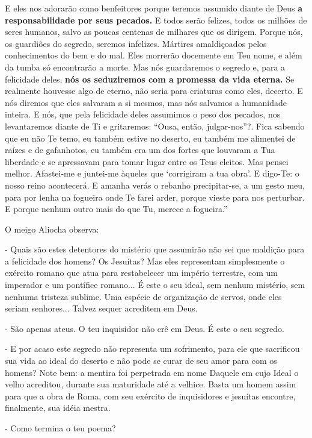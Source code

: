 E eles nos adorarão como benfeitores porque teremos assumido diante de
Deus \textbf{a responsabilidade por seus pecados.} E todos serão
felizes, todos os milhões de seres humanos, salvo as poucas centenas de
milhares que os dirigem. Porque nós, os guardiões do segredo, seremos
infelizes. Mártires amaldiçoados pelos conhecimentos do bem e do mal.
Eles morrerão docemente em Teu nome, e além da tumba só encontrarão a
morte. Mas nós guardaremos o segredo e, para a felicidade deles,
\textbf{nós os seduziremos com a promessa da vida eterna.} Se realmente
houvesse algo de eterno, não seria para criaturas como eles, decerto. E
nós diremos que eles salvaram a si mesmos, mas nós salvamos a humanidade
inteira. E nós, que pela felicidade deles assumimos o peso dos pecados,
nos levantaremos diante de Ti e gritaremos: ``Ousa, então,
julgar-nos''?. Fica sabendo que eu não Te temo, eu também estive no
deserto, eu também me alimentei de raízes e de gafanhotos, eu também era
um dos fortes que louvaram a Tua liberdade e se apressavam para tomar
lugar entre os Teus eleitos. Mas pensei melhor. Afastei-me e juntei-me
àqueles que `corrigiram a tua obra'. E digo-Te: o nosso reino
acontecerá. E amanha verás o rebanho precipitar-se, a um gesto meu, para
por lenha na fogueira onde Te farei arder, porque vieste para nos
perturbar. E porque nenhum outro mais do que Tu, merece a fogueira.''

O meigo Aliocha observa:

- Quais são estes detentores do mistério que assumirão não sei que
maldição para a felicidade dos homens? Os Jesuítas? Mas eles representam
simplesmente o exército romano que atua para restabelecer um império
terrestre, com um imperador e um pontífice romano... É este o seu ideal,
sem nenhum mistério, sem nenhuma tristeza sublime. Uma espécie de
organização de servos, onde eles seriam senhores... Talvez sequer
acreditem em Deus.

- São apenas ateus. O teu inquisidor não crê em Deus. É este o seu
segredo.

- E por acaso este segredo não representa um sofrimento, para ele que
sacrificou sua vida ao ideal do deserto e não pode se curar de seu amor
para com os homens? Note bem: a mentira foi perpetrada em nome Daquele
em cujo Ideal o velho acreditou, durante sua maturidade até a velhice.
Basta um homem assim para que a obra de Roma, com seu exército de
inquisidores e jesuítas encontre, finalmente, sua idéia mestra.

- Como termina o teu poema?

